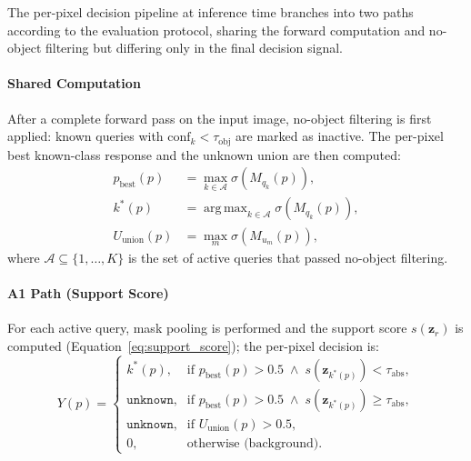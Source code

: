 \documentclass[journal]{IEEEtai}
\newcommand{\bz}{\mathbf{z}}
\newcommand{\tobj}{\tau_{\text{obj}}}
\newcommand{\tabs}{\tau_{\text{abs}}}
\DeclareMathOperator*{\argmax}{arg\,max}
\begin{document}
The per-pixel decision pipeline at inference time branches into two paths according
to the evaluation protocol, sharing the forward computation and no-object filtering
but differing only in the final decision signal.

\paragraph{Shared Computation}
After a complete forward pass on the input image, no-object filtering is first applied:
known queries with $\text{conf}_k < \tobj$ are marked as inactive.
The per-pixel best known-class response and the unknown union are then computed:
\begin{align}
  p_{\text{best}}(p) &= \max_{k \in \mathcal{A}} \sigma\!\left(M_{q_k}(p)\right), \label{eq:best_prob} \\
  k^*(p) &= \argmax_{k \in \mathcal{A}} \sigma\!\left(M_{q_k}(p)\right), \label{eq:best_idx} \\
  U_{\text{union}}(p) &= \max_{m} \sigma\!\left(M_{u_m}(p)\right), \label{eq:u_union_infer}
\end{align}
where $\mathcal{A} \subseteq \{1, \ldots, K\}$ is the set of active queries that
passed no-object filtering.

\paragraph{A1 Path (Support Score)}
For each active query, mask pooling is performed and the support score $s(\bz_r)$
is computed (Equation~\eqref{eq:support_score}); the per-pixel decision is:
\begin{equation}\label{eq:decision_a1}
  Y(p) = \begin{cases}
    k^*(p),           & \text{if } p_{\text{best}}(p) > 0.5 \;\wedge\; s(\bz_{k^*(p)}) < \tabs, \\
    \texttt{unknown}, & \text{if } p_{\text{best}}(p) > 0.5 \;\wedge\; s(\bz_{k^*(p)}) \geq \tabs, \\
    \texttt{unknown}, & \text{if } U_{\text{union}}(p) > 0.5, \\
    0,                & \text{otherwise (background)}.
  \end{cases}
\end{equation}
\end{document}
